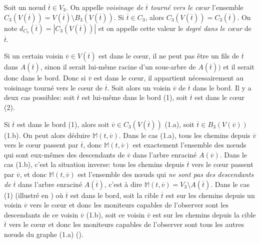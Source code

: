 \begin{definition} Soit un n\oe{}ud $\overline{t} \in V_3$. On appelle {\em voisinage de
$\overline{t}$ tourné vers le cœur} l'ensemble
$C_3(V(\overline{t})) = V(\overline{t}) \setminus B_3(V(\overline{t}))$. Si
$\overline{t} \in C_3$, alors $C_3(V(\overline{t})) = C_3(\overline{t})$. On
note $d_{C_3}(\overline{t}) = |C_3(V(\overline{t}))|$ et on appelle cette valeur
le {\em degré dans le cœur} de $\overline{t}$.
\end{definition}


Si un certain voisin $\overline{v} \in V(\overline{t})$ est dans le cœur, il ne
peut pas être un fils de $\overline{t}$ dans $A(\overline{t})$, sinon il serait
lui-même racine d'un sous-arbre de $A(\overline{t}))$ et il serait donc dans le
bord. Donc si $\overline{v}$ est dans le cœur, il appartient nécessairement au
voisinage tourné vers le cœur de $\overline{t}$. Soit alors un voisin
$\overline{v}$ de $\overline{t}$ dans le bord. Il y a deux cas possibles: soit
$\overline{t}$ est lui-même dans le bord (1), soit $\overline{t}$ est dans le
cœur (2).

Si $\overline{t}$ est dans le bord (1), alors soit $\overline{v} \in
C_3(V(\overline{t}))$ (1.a), soit $\overline{t} \in B_3(V(\overline{v}))$ (1.b).
On peut alors déduire $\mathbb{M}(t, \overline{v})$. Dans le cas (1.a), tous les
chemins depuis $\overline{v}$ vers le cœur passent par $\overline{t}$, donc
$\mathbb{M}(t, \overline{v})$ est exactement l'ensemble des n\oe{}uds qui sont
eux-mêmes des descendants de $\overline{v}$ dans l'arbre enraciné
$A(\overline{v})$. Dans le cas (1.b), c'est la situation inverse: tous les
chemins depuis $\overline{t}$ vers le cœur passent par $\overline{v}$, et donc
$\mathbb{M}(t, \overline{v})$ est l'ensemble des n\oe{}uds qui {\em ne sont pas
des descendants de $\overline{t}$} dans l'arbre enraciné $A(\overline{t})$,
c'est à dire $\mathbb{M}(t, \overline{v}) = V_3 \setminus A(\overline{t})$.
Dans le cas (1) (illustré en ) où
$\overline{t}$ est dans le bord, soit la cible $\overline{t}$ est sur les
chemins depuis un voisin $\overline{v}$ vers le cœur et donc les moniteurs
capables de l'observer sont les descendants de ce voisin $\overline{v}$ (1.b),
soit ce voisin $\overline{v}$ est sur les chemins depuis la cible $\overline{t}$
vers le cœur et donc les moniteurs capables de l'observer sont tous les autres
n\oe{}uds du graphe (1.a) ().

